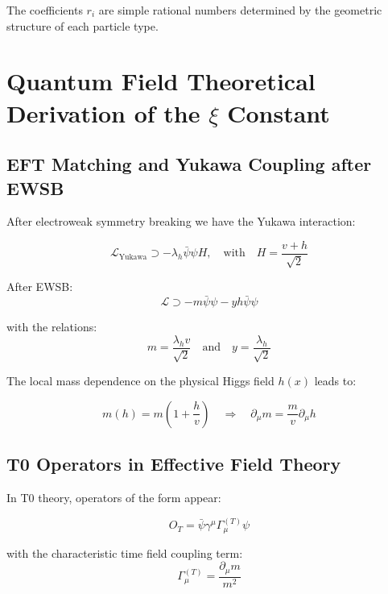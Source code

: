 	The coefficients $r_i$ are simple rational numbers determined by the geometric structure of each particle type.
	
	\section{Quantum Field Theoretical Derivation of the $\xi$ Constant}
	\label{sec:qft_derivation}
	
	\subsection{EFT Matching and Yukawa Coupling after EWSB}
	\label{subsec:eft_matching}
	
	After electroweak symmetry breaking we have the Yukawa interaction:
	
	\begin{equation}
		\mathcal{L}_{\text{Yukawa}} \supset -\lambda_h \bar{\psi}\psi H, \quad \text{with} \quad H = \frac{v + h}{\sqrt{2}}
	\end{equation}
	
	After EWSB:
	\begin{equation}
		\mathcal{L} \supset -m \bar{\psi}\psi - y h \bar{\psi}\psi
	\end{equation}
	
	with the relations:
	\begin{equation}
		m = \frac{\lambda_h v}{\sqrt{2}} \quad \text{and} \quad y = \frac{\lambda_h}{\sqrt{2}}
	\end{equation}
	
	The local mass dependence on the physical Higgs field $h(x)$ leads to:
	
	\begin{equation}
		m(h) = m\left(1 + \frac{h}{v}\right) \quad \Rightarrow \quad \partial_\mu m = \frac{m}{v}\partial_\mu h
	\end{equation}
	
	\subsection{T0 Operators in Effective Field Theory}
	\label{subsec:t0_operators}
	
	In T0 theory, operators of the form appear:
	
	\begin{equation}
		O_T = \bar{\psi}\gamma^\mu\Gamma_\mu^{(T)}\psi
	\end{equation}
	
	with the characteristic time field coupling term:
	\begin{equation}
		\Gamma_\mu^{(T)} = \frac{\partial_\mu m}{m^2}
	\end{equation}
	
